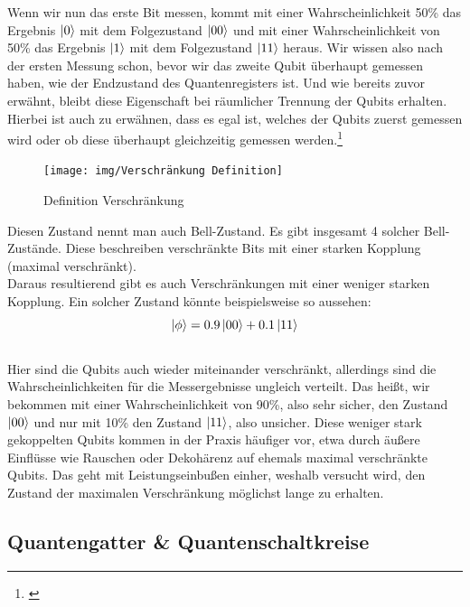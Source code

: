 Wenn wir nun das erste Bit messen, kommt mit einer Wahrscheinlichkeit 50\% das Ergebnis $\ket{0}$ mit dem Folgezustand $\ket{00}$ und mit einer Wahrscheinlichkeit von 50\% das Ergebnis $\ket{1}$ mit dem Folgezustand $\ket{11}$ heraus.
Wir wissen also nach der ersten Messung schon, bevor wir das zweite Qubit überhaupt gemessen haben, wie der Endzustand des Quantenregisters ist.
Und wie bereits zuvor erwähnt, bleibt diese Eigenschaft bei räumlicher Trennung der Qubits erhalten.
Hierbei ist auch zu erwähnen, dass es egal ist, welches der Qubits zuerst gemessen wird oder ob diese überhaupt gleichzeitig gemessen werden.\footnote{\cite[S. 76]{homeister_quantum_2022}}\\
\begin{figure}[H]
    \centering
    \texttt{[image: img/Verschränkung Definition]}
    \caption{Definition Verschränkung}
    \label{fig:verschraenkung}
\end{figure}

Diesen Zustand nennt man auch Bell-Zustand.
Es gibt insgesamt 4 solcher Bell-Zustände.
Diese beschreiben verschränkte Bits mit einer starken Kopplung (maximal verschränkt).\\
Daraus resultierend gibt es auch Verschränkungen mit einer weniger starken Kopplung.
Ein solcher Zustand könnte beispielsweise so aussehen:
\begin{equation}
    \ket{\phi} = 0.9\ket{00} + 0.1\ket{11}
\end{equation}\\

Hier sind die Qubits auch wieder miteinander verschränkt, allerdings sind die Wahrscheinlichkeiten für die Messergebnisse ungleich verteilt.
Das heißt, wir bekommen mit einer Wahrscheinlichkeit von 90\%, also sehr sicher, den Zustand $\ket{00}$ und nur mit 10\% den Zustand $\ket{11}$, also unsicher.
Diese weniger stark gekoppelten Qubits kommen in der Praxis häufiger vor, etwa durch äußere Einflüsse wie Rauschen oder Dekohärenz auf ehemals maximal verschränkte Qubits.
Das geht mit Leistungseinbußen einher, weshalb versucht wird, den Zustand der maximalen Verschränkung möglichst lange zu erhalten.\\


\subsection{Quantengatter \& Quantenschaltkreise}
\label{subsec:quantengatter-quantenschaltkreise}

